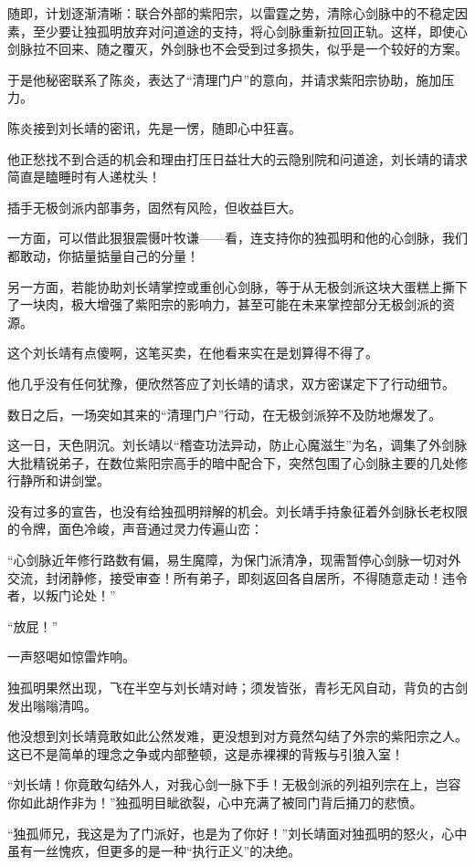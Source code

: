 随即，计划逐渐清晰：联合外部的紫阳宗，以雷霆之势，清除心剑脉中的不稳定因素，至少要让独孤明放弃对问道途的支持，将心剑脉重新拉回正轨。这样，即使心剑脉拉不回来、随之覆灭，外剑脉也不会受到过多损失，似乎是一个较好的方案。

于是他秘密联系了陈炎，表达了“清理门户”的意向，并请求紫阳宗协助，施加压力。

陈炎接到刘长靖的密讯，先是一愣，随即心中狂喜。

他正愁找不到合适的机会和理由打压日益壮大的云隐别院和问道途，刘长靖的请求简直是瞌睡时有人递枕头！

插手无极剑派内部事务，固然有风险，但收益巨大。

一方面，可以借此狠狠震慑叶牧谦——看，连支持你的独孤明和他的心剑脉，我们都敢动，你掂量掂量自己的分量！

另一方面，若能协助刘长靖掌控或重创心剑脉，等于从无极剑派这块大蛋糕上撕下了一块肉，极大增强了紫阳宗的影响力，甚至可能在未来掌控部分无极剑派的资源。

这个刘长靖有点傻啊，这笔买卖，在他看来实在是划算得不得了。

他几乎没有任何犹豫，便欣然答应了刘长靖的请求，双方密谋定下了行动细节。

\vspace{2em}

数日之后，一场突如其来的“清理门户”行动，在无极剑派猝不及防地爆发了。

这一日，天色阴沉。刘长靖以“稽查功法异动，防止心魔滋生”为名，调集了外剑脉大批精锐弟子，在数位紫阳宗高手的暗中配合下，突然包围了心剑脉主要的几处修行静所和讲剑堂。

没有过多的宣告，也没有给独孤明辩解的机会。刘长靖手持象征着外剑脉长老权限的令牌，面色冷峻，声音通过灵力传遍山峦：

“心剑脉近年修行路数有偏，易生魔障，为保门派清净，现需暂停心剑脉一切对外交流，封闭静修，接受审查！所有弟子，即刻返回各自居所，不得随意走动！违令者，以叛门论处！”

“放屁！”

一声怒喝如惊雷炸响。

独孤明果然出现，飞在半空与刘长靖对峙；须发皆张，青衫无风自动，背负的古剑发出嗡嗡清鸣。

他没想到刘长靖竟敢如此公然发难，更没想到对方竟然勾结了外宗的紫阳宗之人。这已不是简单的理念之争或内部整顿，这是赤裸裸的背叛与引狼入室！

“刘长靖！你竟敢勾结外人，对我心剑一脉下手！无极剑派的列祖列宗在上，岂容你如此胡作非为！”独孤明目眦欲裂，心中充满了被同门背后捅刀的悲愤。

“独孤师兄，我这是为了门派好，也是为了你好！”刘长靖面对独孤明的怒火，心中虽有一丝愧疚，但更多的是一种“执行正义”的决绝。

